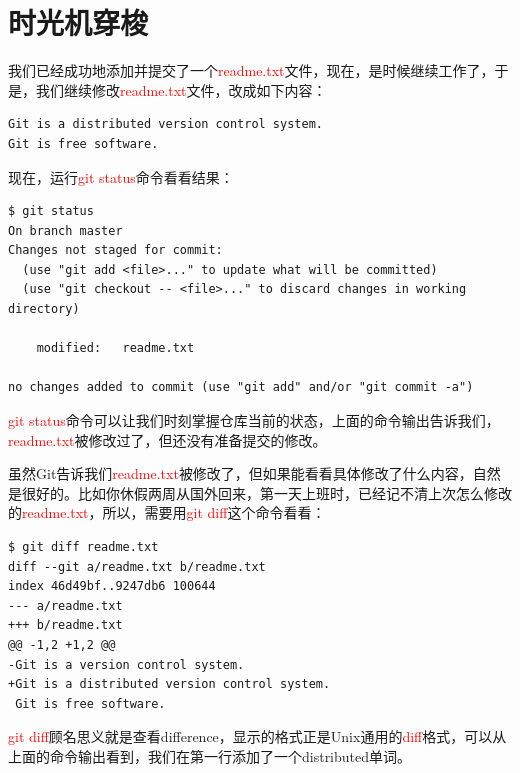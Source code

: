 \chapter{时光机穿梭}

我们已经成功地添加并提交了一个\textcolor{red}{readme.txt}文件，现在，是时候继续工作了，于是，我们继续修改\textcolor{red}{readme.txt}文件，改成如下内容：

\begin{verbatim}
Git is a distributed version control system.
Git is free software.
\end{verbatim}

现在，运行\textcolor{red}{git status}命令看看结果：

\begin{verbatim}
$ git status
On branch master
Changes not staged for commit:
  (use "git add <file>..." to update what will be committed)
  (use "git checkout -- <file>..." to discard changes in working directory)

	modified:   readme.txt

no changes added to commit (use "git add" and/or "git commit -a")
\end{verbatim}

\textcolor{red}{git status}命令可以让我们时刻掌握仓库当前的状态，上面的命令输出告诉我们，\textcolor{red}{readme.txt}被修改过了，但还没有准备提交的修改。

虽然Git告诉我们\textcolor{red}{readme.txt}被修改了，但如果能看看具体修改了什么内容，自然是很好的。比如你休假两周从国外回来，第一天上班时，已经记不清上次怎么修改的\textcolor{red}{readme.txt}，所以，需要用\textcolor{red}{git diff}这个命令看看：

\begin{verbatim}
$ git diff readme.txt 
diff --git a/readme.txt b/readme.txt
index 46d49bf..9247db6 100644
--- a/readme.txt
+++ b/readme.txt
@@ -1,2 +1,2 @@
-Git is a version control system.
+Git is a distributed version control system.
 Git is free software.
\end{verbatim}

\textcolor{red}{git diff}顾名思义就是查看difference，显示的格式正是Unix通用的\textcolor{red}{diff}格式，可以从上面的命令输出看到，我们在第一行添加了一个distributed单词。

